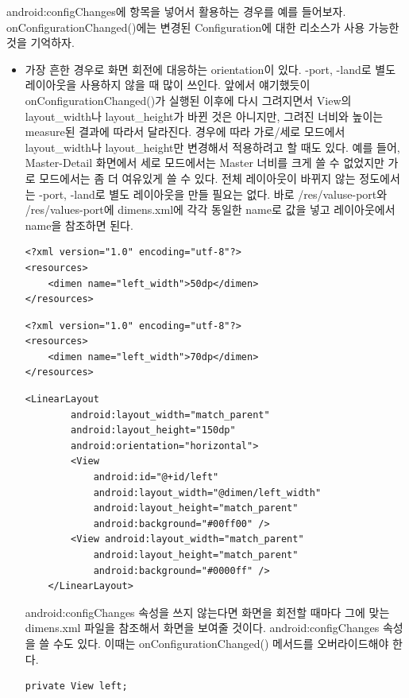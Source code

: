 android:configChanges에 항목을 넣어서 활용하는 경우를 예를 들어보자. 
onConfigurationChanged()에는 변경된 Configuration에 대한 리소스가 사용 가능한 것을 기억하자. 
\begin{itemize}
\item 가장 흔한 경우로 화면 회전에 대응하는 orientation이 있다. -port, -land로 별도 레이아웃을 사용하지 않을 때 많이 쓰인다. 앞에서 얘기했듯이 onConfigurationChanged()가 실행된 이후에 다시 그려지면서 View의 layout\_width나 layout\_height가 바뀐 것은 아니지만, 그려진 너비와 높이는 measure된 결과에 따라서 달라진다.
경우에 따라 가로/세로 모드에서 layout\_width나 layout\_height만 변경해서 적용하려고 할 때도 있다. 
예를 들어, Master-Detail 화면에서 세로 모드에서는 Master 너비를 크게 쓸 수 없었지만 가로 모드에서는 좀 더 여유있게 쓸 수 있다. 전체 레이아웃이 바뀌지 않는 정도에서는 -port, -land로 별도 레이아웃을 만들 필요는 없다.
바로 /res/valuse-port와 /res/values-port에 dimens.xml에 각각 동일한 name로 값을 넣고 레이아웃에서 name을 참조하면 된다.
\begin{lstlisting}[frame=single, caption=/res/values-port/dimens.xml]
<?xml version="1.0" encoding="utf-8"?>
<resources>
	<dimen name="left_width">50dp</dimen>
</resources>
\end{lstlisting}

\begin{lstlisting}[frame=single, caption=/res/values-land/dimens.xml]
<?xml version="1.0" encoding="utf-8"?>
<resources>
	<dimen name="left_width">70dp</dimen>
</resources>
\end{lstlisting}

\begin{lstlisting}[frame=single, caption=/res/layout/view\_list.xml 일부분]
	<LinearLayout
		android:layout_width="match_parent"
		android:layout_height="150dp"
		android:orientation="horizontal">
		<View
			android:id="@+id/left"
			android:layout_width="@dimen/left_width"
			android:layout_height="match_parent"
			android:background="#00ff00" />
		<View android:layout_width="match_parent"
			android:layout_height="match_parent"
			android:background="#0000ff" />
	</LinearLayout>		
\end{lstlisting}
android:configChanges 속성을 쓰지 않는다면 화면을 회전할 때마다 그에 맞는 dimens.xml 파일을 참조해서 화면을 보여줄 것이다. 
android:configChanges 속성을 쓸 수도 있다. 이때는 onConfigurationChanged() 메서드를 오버라이드해야 한다.

\begin{lstlisting}[frame=single]
	private View left;


\end{lstlisting}
\end{itemize}
